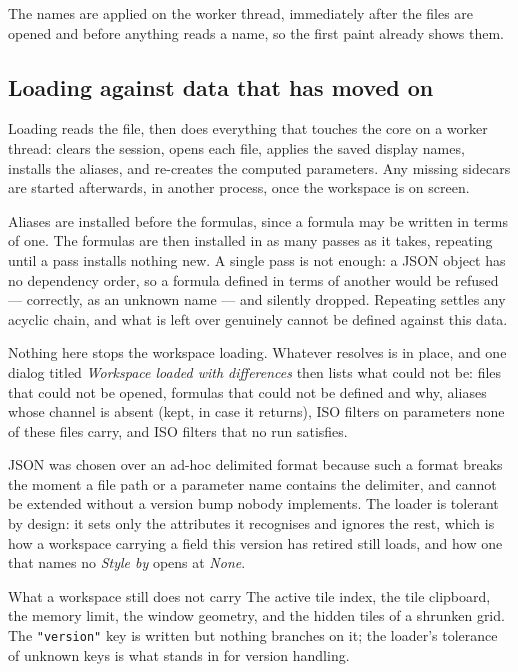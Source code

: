 \documentclass[11pt,a4paper,oneside]{report}
\newcommand{\code}[1]{\texttt{#1}}
\begin{document}
The names are applied on the worker thread, immediately after the files are
opened and before anything reads a name, so the first paint already shows them.

\subsection{Loading against data that has moved on}

Loading reads the file, then does everything that touches the core on a worker
thread: clears the session, opens each file, applies the saved display names,
installs the aliases, and re-creates the computed parameters. Any missing
sidecars are started afterwards, in another process, once the workspace is on
screen.

Aliases are installed before the formulas, since a formula may be written in
terms of one. The formulas are then installed in as many passes as it takes,
repeating until a pass installs nothing new. A single pass is not enough: a JSON
object has no dependency order, so a formula defined in terms of another would be
refused --- correctly, as an unknown name --- and silently dropped. Repeating
settles any acyclic chain, and what is left over genuinely cannot be defined
against this data.

Nothing here stops the workspace loading. Whatever resolves is in place, and one
dialog titled \emph{Workspace loaded with differences} then lists what could not
be: files that could not be opened, formulas that could not be defined and why,
aliases whose channel is absent (kept, in case it returns), ISO filters on
parameters none of these files carry, and ISO filters that no run satisfies.

JSON was chosen over an ad-hoc delimited format because such a format breaks the
moment a file path or a parameter name contains the delimiter, and cannot be
extended without a version bump nobody implements. The loader is tolerant by
design: it sets only the attributes it recognises and ignores the rest, which
is how a workspace carrying a field this version has retired still loads, and
how one that names no \emph{Style by} opens at \emph{None}.

\begin{aoenote}{What a workspace still does not carry}
The active tile index, the tile clipboard, the memory limit, the window geometry,
and the hidden tiles of a shrunken grid. The \code{"version"} key is written but
nothing branches on it; the loader's tolerance of unknown keys is what stands in
for version handling.
\end{aoenote}
\end{document}
